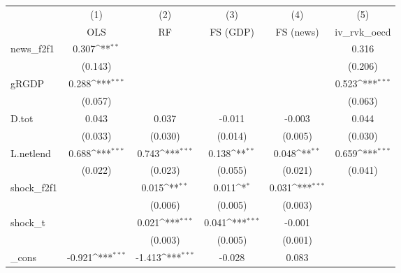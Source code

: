 {
\def\sym#1{\ifmmode^{#1}\else\(^{#1}\)\fi}
\begin{tabular}{l*{5}{c}}
\toprule
            &\multicolumn{1}{c}{(1)}&\multicolumn{1}{c}{(2)}&\multicolumn{1}{c}{(3)}&\multicolumn{1}{c}{(4)}&\multicolumn{1}{c}{(5)}\\
            &\multicolumn{1}{c}{OLS}&\multicolumn{1}{c}{RF}&\multicolumn{1}{c}{FS (GDP)}&\multicolumn{1}{c}{FS (news)}&\multicolumn{1}{c}{iv\_rvk\_oecd}\\
\midrule
news\_f2f1   &       0.307\sym{**} &                     &                     &                     &       0.316         \\
            &     (0.143)         &                     &                     &                     &     (0.206)         \\
\addlinespace
gRGDP       &       0.288\sym{***}&                     &                     &                     &       0.523\sym{***}\\
            &     (0.057)         &                     &                     &                     &     (0.063)         \\
\addlinespace
D.tot       &       0.043         &       0.037         &      -0.011         &      -0.003         &       0.044         \\
            &     (0.033)         &     (0.030)         &     (0.014)         &     (0.005)         &     (0.030)         \\
\addlinespace
L.netlend   &       0.688\sym{***}&       0.743\sym{***}&       0.138\sym{**} &       0.048\sym{**} &       0.659\sym{***}\\
            &     (0.022)         &     (0.023)         &     (0.055)         &     (0.021)         &     (0.041)         \\
\addlinespace
shock\_f2f1  &                     &       0.015\sym{**} &       0.011\sym{*}  &       0.031\sym{***}&                     \\
            &                     &     (0.006)         &     (0.005)         &     (0.003)         &                     \\
\addlinespace
shock\_t     &                     &       0.021\sym{***}&       0.041\sym{***}&      -0.001         &                     \\
            &                     &     (0.003)         &     (0.005)         &     (0.001)         &                     \\
\addlinespace
\_cons      &      -0.921\sym{***}&      -1.413\sym{***}&      -0.028         &       0.083         &                     \\

\end{tabular}}
